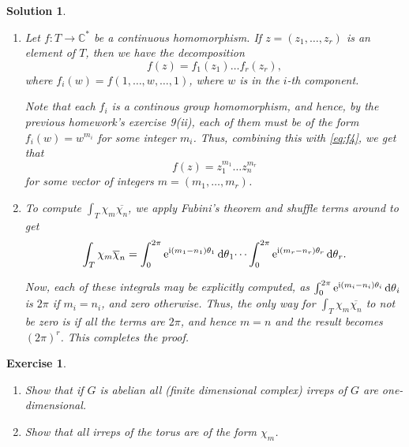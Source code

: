 \documentclass{article}
\newtheorem{ex}{Exercise}
\theoremstyle{nonumberplain}
\newtheorem{sol}{Solution}
\newcommand{\C}{\mathbb{C}}
\newcommand{\I}{\mathrm{i}}
\newcommand{\e}{\mathrm{e}}
\newcommand{\conj}[1]{\overline{#1}}
\begin{document}
\begin{sol}\leavevmode
\begin{enumerate}
\item Let $f \colon T \to \C^*$ be a continuous homomorphism. If $z = (z_1, \dots, z_r)$ is an element of $T$, then we have the decomposition
\begin{equation}\label{eq:f4}
f(z) = f_1(z_1) \dots f_r(z_r),
\end{equation}
where $f_i(w) = f(1,\dots, w, \dots, 1)$, where $w$ is in the $i$-th component.

Note that each $f_i$ is a continous group homomorphism, and hence, by the previous homework's exercise 9(ii), each of them must be of the form $f_i(w) = w^{m_i}$ for some integer $m_i$. Thus, combining this with \eqref{eq:f4}, we get that
\begin{equation}
f(z) = z_1^{m_1} \dots z_n^{m_r}
\end{equation}
for some vector of integers $m = (m_1, \dots, m_r)$.

\item To compute $\int_T \chi_m \conj{\chi_n}$, we apply Fubini's theorem and shuffle terms around to get
\begin{equation}
\int_T \chi_m \conj \chi_n = \int_0^{2\pi} \e^{\I(m_1-n_1) \theta_1} \dl \theta_1 \dots \int_0^{2\pi} \e^{\I(m_r-n_r) \theta_r} \dl \theta_r.
\end{equation}

Now, each of these integrals may be explicitly computed, as $\int_0^{2\pi} \e^{\I(m_i-n_i) \theta_i} \dl \theta_i$ is $2\pi$ if $m_i = n_i$, and zero otherwise. Thus, the only way for $\int_T \chi_m \conj{\chi_n}$ to not be zero is if all the terms are $2\pi$, and hence $m = n$ and the result becomes $(2\pi)^r$. This completes the proof.
\end{enumerate}
\end{sol}

\begin{ex}\leavevmode
\begin{enumerate}
\item Show that if $G$ is abelian all (finite dimensional complex) irreps of $G$ are one-dimensional.
\item Show that all irreps of the torus are of the form $\chi_m$.
\end{enumerate}
\end{ex}
\end{document}
